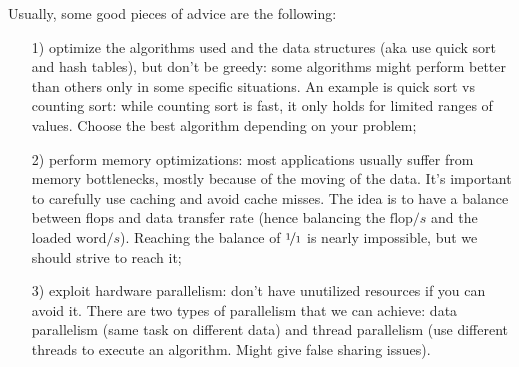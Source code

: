 Usually, some good pieces of advice are the following:
\begin{itemize}
    \item [1)] optimize the algorithms used and the data structures (aka use quick sort and hash tables), but don't be greedy: some algorithms might perform better than others only in some specific situations. An example is quick sort vs counting sort: while counting sort is fast, it only holds for limited ranges of values. Choose the best algorithm depending on your problem;
    \item [2)] perform memory optimizations: most applications usually suffer from memory bottlenecks, mostly because of the moving of the data. It's important to carefully use caching and avoid cache misses. The idea is to have a balance between flops and data transfer rate (hence balancing the $\text{flop}/s$ and the $\text{loaded word}/s$). Reaching the balance of $\nicefrac{1}{1}$ is nearly impossible, but we should strive to reach it;
    \item [3)] exploit hardware parallelism: don't have unutilized resources if you can avoid it. There are two types of parallelism that we can achieve: data parallelism (same task on different data) and thread parallelism (use different threads to execute an algorithm. Might give false sharing issues).
\end{itemize}